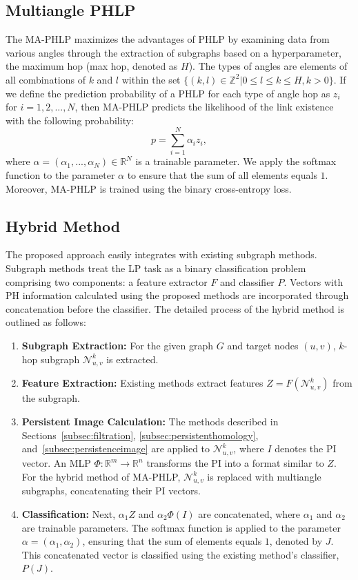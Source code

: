 \subsection{Multiangle PHLP}
\label{subsec:maphlp}
The MA-PHLP maximizes the advantages of PHLP by examining data from various angles through the extraction of subgraphs based on a hyperparameter, the maximum hop (max hop, denoted as $H$).
The types of angles are elements of all combinations of \(k\) and \(l\) within the set \(\{(k,l) \in \mathbb{Z}^2 | 0 \leq l \leq k \leq H, k > 0\}\).
If we define the prediction probability of a PHLP for each type of angle hop as $z_i$ for $i=1, 2, ..., N$, then MA-PHLP predicts the likelihood of the link existence with the following probability: 
$$p = \sum_{i=1}^N \alpha_iz_i ,$$
where $\alpha = (\alpha_1,...,\alpha_N) \in \mathbb{R}^N$ is a trainable parameter.
We apply the softmax function to the parameter \(\alpha\) to ensure that the sum of all elements equals $1$. 
Moreover, MA-PHLP is trained using the binary cross-entropy loss.

\subsection{Hybrid Method}
\label{subsec:hybrid}
The proposed approach easily integrates with existing subgraph methods. Subgraph methods treat the LP task as a binary classification problem comprising two components: a feature extractor $F$ and classifier $P$. Vectors with PH information calculated using the proposed methods are incorporated through concatenation before the classifier.
The detailed process of the hybrid method is outlined as follows: 
\begin{enumerate}
    \item \textbf{Subgraph Extraction:} For the given graph $G$ and target nodes $(u,v)$, $k$-hop subgraph $\mathcal{N}^k_{u,v}$ is extracted. 
    \item \textbf{Feature Extraction:} Existing methods extract features $Z = F(\mathcal{N}^k_{u,v})$ from the subgraph.
    \item \textbf{Persistent Image Calculation:} The methods described in Sections~\ref{subsec:filtration}, \ref{subsec:persistenthomology}, and~\ref{subsec:persistenceimage} are applied to $\mathcal{N}^k_{u,v}$, where $I$ denotes the PI vector. An MLP $\Phi:\mathbb{R}^m \rightarrow \mathbb{R}^n$ transforms the PI into a format similar to $Z$. 
    For the hybrid method of MA-PHLP, $\mathcal{N}^k_{u,v}$ is replaced with multiangle subgraphs, concatenating their PI vectors.
    \item \textbf{Classification:} Next, $\alpha_1 Z$ and $\alpha_2 \Phi(I)$ are concatenated, where $\alpha_1$ and $\alpha_2$ are trainable parameters. The softmax function is applied to the parameter \(\alpha=(\alpha_1,\alpha_2)\), ensuring that the sum of elements equals $1$, denoted by $J$.
    This concatenated vector is classified using the existing method's classifier, $P(J)$.
\end{enumerate}